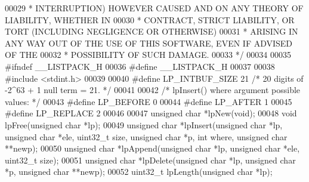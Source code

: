 \begin{DoxyCode}
00029 \textcolor{comment}{ * INTERRUPTION) HOWEVER CAUSED AND ON ANY THEORY OF LIABILITY, WHETHER IN}
00030 \textcolor{comment}{ * CONTRACT, STRICT LIABILITY, OR TORT (INCLUDING NEGLIGENCE OR OTHERWISE)}
00031 \textcolor{comment}{ * ARISING IN ANY WAY OUT OF THE USE OF THIS SOFTWARE, EVEN IF ADVISED OF THE}
00032 \textcolor{comment}{ * POSSIBILITY OF SUCH DAMAGE.}
00033 \textcolor{comment}{ */}
00034 
00035 \textcolor{preprocessor}{#}\textcolor{preprocessor}{ifndef} \textcolor{preprocessor}{\_\_LISTPACK\_H}
00036 \textcolor{preprocessor}{#}\textcolor{preprocessor}{define} \textcolor{preprocessor}{\_\_LISTPACK\_H}
00037 
00038 \textcolor{preprocessor}{#}\textcolor{preprocessor}{include} \textcolor{preprocessor}{<}\textcolor{preprocessor}{stdint}\textcolor{preprocessor}{.}\textcolor{preprocessor}{h}\textcolor{preprocessor}{>}
00039 
00040 \textcolor{preprocessor}{#}\textcolor{preprocessor}{define} \textcolor{preprocessor}{LP\_INTBUF\_SIZE} 21 \textcolor{comment}{/* 20 digits of -2^63 + 1 null term = 21. */}
00041 
00042 \textcolor{comment}{/* lpInsert() where argument possible values: */}
00043 \textcolor{preprocessor}{#}\textcolor{preprocessor}{define} \textcolor{preprocessor}{LP\_BEFORE} 0
00044 \textcolor{preprocessor}{#}\textcolor{preprocessor}{define} \textcolor{preprocessor}{LP\_AFTER} 1
00045 \textcolor{preprocessor}{#}\textcolor{preprocessor}{define} \textcolor{preprocessor}{LP\_REPLACE} 2
00046 
00047 \textcolor{keywordtype}{unsigned} \textcolor{keywordtype}{char} *lpNew(\textcolor{keywordtype}{void});
00048 \textcolor{keywordtype}{void} lpFree(\textcolor{keywordtype}{unsigned} \textcolor{keywordtype}{char} *lp);
00049 \textcolor{keywordtype}{unsigned} \textcolor{keywordtype}{char} *lpInsert(\textcolor{keywordtype}{unsigned} \textcolor{keywordtype}{char} *lp, \textcolor{keywordtype}{unsigned} \textcolor{keywordtype}{char} *ele, uint32\_t size, \textcolor{keywordtype}{unsigned} \textcolor{keywordtype}{char} *p, \textcolor{keywordtype}{int} 
      where, \textcolor{keywordtype}{unsigned} \textcolor{keywordtype}{char} **newp);
00050 \textcolor{keywordtype}{unsigned} \textcolor{keywordtype}{char} *lpAppend(\textcolor{keywordtype}{unsigned} \textcolor{keywordtype}{char} *lp, \textcolor{keywordtype}{unsigned} \textcolor{keywordtype}{char} *ele, uint32\_t size);
00051 \textcolor{keywordtype}{unsigned} \textcolor{keywordtype}{char} *lpDelete(\textcolor{keywordtype}{unsigned} \textcolor{keywordtype}{char} *lp, \textcolor{keywordtype}{unsigned} \textcolor{keywordtype}{char} *p, \textcolor{keywordtype}{unsigned} \textcolor{keywordtype}{char} **newp);
00052 uint32\_t lpLength(\textcolor{keywordtype}{unsigned} \textcolor{keywordtype}{char} *lp);

\end{DoxyCode}
